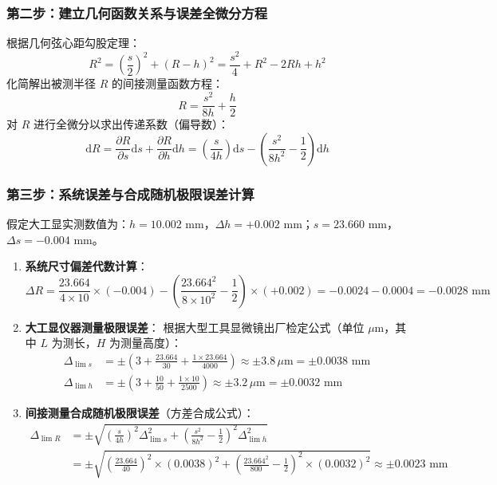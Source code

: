 \documentclass[11pt,a4paper]{ctexart}
\begin{document}
\subsubsection{第二步：建立几何函数关系与误差全微分方程}
根据几何弦心距勾股定理：
\[ R^2 = \left(\frac{s}{2}\right)^2 + (R - h)^2 = \frac{s^2}{4} + R^2 - 2Rh + h^2 \]
化简解出被测半径 $R$ 的间接测量函数方程：
\begin{equation}
R = \frac{s^2}{8h} + \frac{h}{2}
\end{equation}
对 $R$ 进行全微分以求出传递系数（偏导数）：
\begin{equation}
\mathrm{d}R = \frac{\partial R}{\partial s} \mathrm{d}s + \frac{\partial R}{\partial h} \mathrm{d}h = \left(\frac{s}{4h}\right) \mathrm{d}s - \left(\frac{s^2}{8h^2} - \frac{1}{2}\right) \mathrm{d}h
\end{equation}

\subsubsection{第三步：系统误差与合成随机极限误差计算}
假定大工显实测数值为：$h = 10.002\text{ mm}$，$\Delta h = +0.002\text{ mm}$；$s = 23.660\text{ mm}$，$\Delta s = -0.004\text{ mm}$。
\begin{enumerate}[leftmargin=1.5em, itemsep=3pt]
    \item \textbf{系统尺寸偏差代数计算}：
    \[ \Delta R = \frac{23.664}{4 \times 10} \times (-0.004) - \left( \frac{23.664^2}{8 \times 10^2} - \frac{1}{2} \right) \times (+0.002) = -0.0024 - 0.0004 = -0.0028\text{ mm} \]
    
    \item \textbf{大工显仪器测量极限误差}：
    根据大型工具显微镜出厂检定公式（单位 $\mu\text{m}$，其中 $L$ 为测长，$H$ 为测量高度）：
    \begin{align*}
    \Delta_{\lim s} &= \pm \left( 3 + \frac{23.664}{30} + \frac{1 \times 23.664}{4000} \right) \approx \pm 3.8\,\mu\text{m} = \pm 0.0038\text{ mm} \\
    \Delta_{\lim h} &= \pm \left( 3 + \frac{10}{50} + \frac{1 \times 10}{2500} \right) \approx \pm 3.2\,\mu\text{m} = \pm 0.0032\text{ mm}
    \end{align*}
    
    \item \textbf{间接测量合成随机极限误差}（方差合成公式）：
    \begin{align*}
    \Delta_{\lim R} &= \pm \sqrt{ \left(\frac{s}{4h}\right)^2 \Delta_{\lim s}^2 + \left(\frac{s^2}{8h^2} - \frac{1}{2}\right)^2 \Delta_{\lim h}^2 } \\
    &= \pm \sqrt{ \left(\frac{23.664}{40}\right)^2 \times (0.0038)^2 + \left(\frac{23.664^2}{800} - \frac{1}{2}\right)^2 \times (0.0032)^2 } \approx \pm 0.0023\text{ mm}
    \end{align*}
\end{enumerate}
\end{document}
